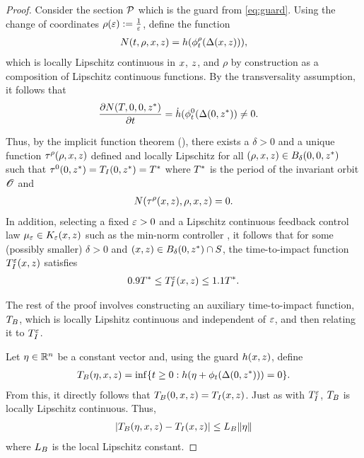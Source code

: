 \begin{proof}
  Consider the \Poincare{} section $\mathcal{P}$ which is the guard from \eqref{eq:guard}.
  Using the change of coordinates $\rho(\varepsilon) := \tfrac{1}{\varepsilon}$, define the function
  \begin{align}
    N(t, \rho, x, z) = h(\phi^{\rho}_{t}(\Delta(x, z))),
  \end{align}
  which is locally Lipschitz continuous in $x$, $z$, and $\rho$ by construction as a composition of Lipschitz continuous functions.
  By the transversality assumption, it follows that
  \begin{align}
    \frac{\partial{N(T, 0, 0, z^{*})}}{\partial{t}} &= \dot h(\phi^{0}_{t} (\Delta(0, z^{*})) \ne 0.
  \end{align}

  Thus, by the implicit function theorem (\cite{Sun01}), there exists a $\delta > 0$ and a unique function $\tau^{\rho}(\rho, x, z)$ defined and locally Lipschitz for all $(\rho, x, z) \in B_{\delta}(0, 0, z^{*})$ such that $\tau^{0}(0, z^{*}) = T_{I}(0, z^{*}) = T^{*}$ where $T^{*}$ is the period of the invariant orbit ${\mathscr O}$ and
  \begin{align}
    N(\tau^{\rho}(x, z), \rho, x, z) = 0.
  \end{align}
  In addition, selecting a fixed  $\varepsilon > 0$ and a Lipschitz continuous feedback control law $\mu_{\varepsilon} \in K_{\varepsilon}(x, z)$ such as the min-norm controller \cite{FreeKoko}, it follows that for some (possibly smaller) $\delta > 0$ and $(x, z) \in B_{\delta}(0, z^{*}) \cap S$, the time-to-impact function $T_{I}^{\varepsilon}(x, z)$ satisfies
  \begin{align}
    \label{eq:TIe-bounds}
    0.9 T^{*} \leq T_{I}^{\varepsilon}(x, z) \leq 1.1 T^{*}.
  \end{align}
  
  The rest of the proof involves constructing an auxiliary time-to-impact function, $T_{B}$, which is locally Lipshitz continuous and independent of $\varepsilon$, and then relating it to $T_{I}^{\varepsilon}$.
  
  Let $\eta \in \mathbb{R}^{n}$ be a constant vector and, using the guard $h(x, z)$, define
  \begin{align}
    T_{B}(\eta, x, z) = \inf\{t \geq 0 : h(\eta + \phi_{t}(\Delta(0, z^{*}))) = 0\}.
  \end{align}
  From this, it directly follows that $T_{B}(0, x, z) = T_{I}(x, z)$.
  Just as with $T_{I}^{\varepsilon}$, $T_{B}$ is locally Lipschitz continuous.
  Thus,
  \begin{align}
    | T_{B}(\eta, x, z) - T_{I}(x, z) | \leq L_{B} \| \eta \|
  \end{align}
  where $L_{B}$ is the local Lipschitz constant.


\end{proof}
